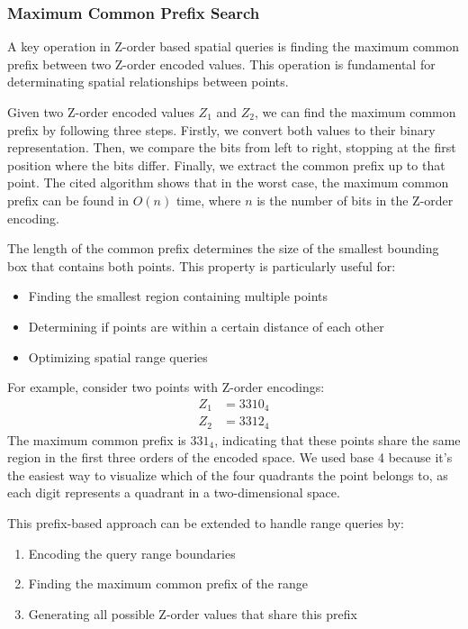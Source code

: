 \documentclass[12pt,a4paper,twoside]{book}
\begin{document}
\subsubsection{Maximum Common Prefix Search}
A key operation in Z-order based spatial queries is finding the maximum common prefix between two Z-order encoded values. This operation is fundamental for determinating spatial relationships between points.

Given two Z-order encoded values \( Z_1 \) and \( Z_2 \), we can find the maximum common prefix by following three steps. Firstly, we convert both values to their binary representation. Then, we compare the bits from left to right, stopping at the first position where the bits differ. Finally, we extract the common prefix up to that point. The cited algorithm shows that in the worst case, the maximum common prefix can be found in \( O(n) \) time, where \( n \) is the number of bits in the Z-order encoding.

The length of the common prefix determines the size of the smallest bounding box that contains both points. This property is particularly useful for:
\begin{itemize}
    \item Finding the smallest region containing multiple points
    \item Determining if points are within a certain distance of each other
    \item Optimizing spatial range queries
\end{itemize}

For example, consider two points with Z-order encodings:
\begin{align*}
    Z_1 &= 3310_4 \\
    Z_2 &= 3312_4
\end{align*}
The maximum common prefix is \( 331_4 \), indicating that these points share the same region in the first three orders of the encoded space. We used base 4 because it's the easiest way to visualize which of the four quadrants the point belongs to, as each digit represents a quadrant in a two-dimensional space.

This prefix-based approach can be extended to handle range queries by:
\begin{enumerate}
    \item Encoding the query range boundaries
    \item Finding the maximum common prefix of the range
    \item Generating all possible Z-order values that share this prefix
\end{enumerate}
\end{document}
